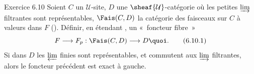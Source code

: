 \documentclass[10pt]{../fichiers-configuration-latex/smfart}
\begin{document}
\begin{enonce*}[remark]{Exercice 6.10}
Soient $C$ un $\mathcal{U}$-site, $D$ une
$\sheaf{\mathcal{U}}$-catégorie où les petites $\varinjlim$
filtrantes sont représentables, $\Fais(C,D)$ la catégorie des
faisceaux sur $C$ à valeurs dans $F$ (). Définir, en
étendant , un « foncteur fibre »
\begin{equation*}
F\longrightarrow F_p:\Fais(C,D)\longrightarrow D{\quoi}.\tag{6.10.1}
\end{equation*}
Si dans $D$ les $\varprojlim$ finies sont représentables, et
commutent aux $\varinjlim$ filtrantes, alors le foncteur précédent
est exact à gauche.
\end{enonce*}
\end{document}
